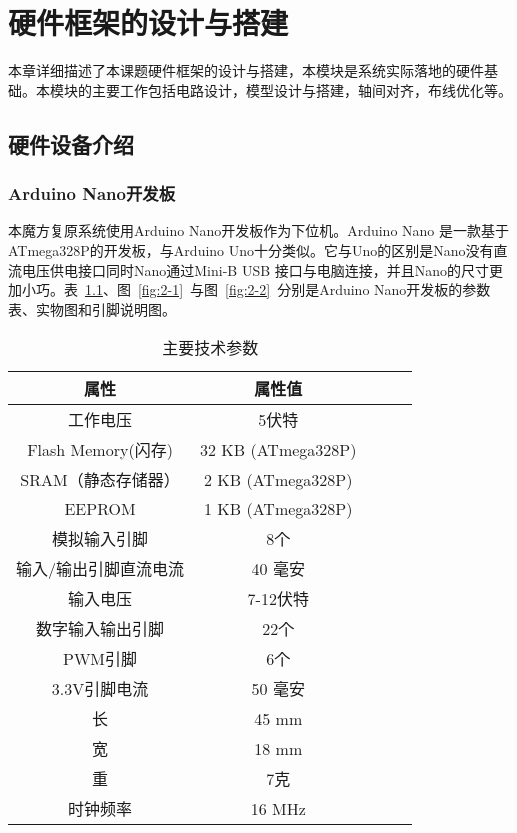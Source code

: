 \chapter{硬件框架的设计与搭建}

本章详细描述了本课题硬件框架的设计与搭建，本模块是系统实际落地的硬件基础。本模块的主要工作包括电路设计，模型设计与搭建，轴间对齐，布线优化等。

\section{硬件设备介绍}

\subsection{Arduino Nano开发板}

本魔方复原系统使用Arduino Nano开发板作为下位机。Arduino Nano 是一款基于 ATmega328P的开发板，与Arduino Uno十分类似。它与Uno的区别是Nano没有直流电压供电接口同时Nano通过Mini-B USB 接口与电脑连接，并且Nano的尺寸更加小巧。表~\ref{tab:2-1}、图~\ref{fig:2-1}~与图~\ref{fig:2-2}~分别是Arduino Nano开发板的参数表、实物图和引脚说明图。

\begin{table}[H]
	\caption{主要技术参数}\label{tab:2-1}
	\vspace{0.5em}
	\begin{center}
		{\wuhao
			\begin{tabular}{ccccc}
				\toprule
				属性 & 属性值	\\
				\midrule
				工作电压 & 5伏特 \\
				Flash Memory(闪存) & 32 KB (ATmega328P)\\
				SRAM（静态存储器） & 2 KB (ATmega328P)\\
				EEPROM & 1 KB (ATmega328P)\\
				模拟输入引脚	& 8个\\
				输入/输出引脚直流电流	& 40 毫安\\
				输入电压 & 7-12伏特\\
				数字输入输出引脚 & 22个\\
				PWM引脚 & 6个\\
				3.3V引脚电流 & 50 毫安\\
				长 & 45 mm\\
				宽 & 18 mm\\
				重 & 7克\\
				时钟频率 & 16 MHz\\
				\bottomrule
		\end{tabular}}
	\end{center}
	\vspace{-1.5em}
\end{table}

